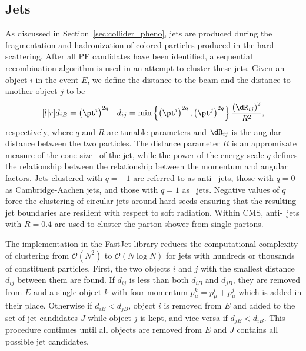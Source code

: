 \subsection{Jets}
\label{sec:pf_jets}

As discussed in Section~\ref{sec:collider_pheno}, jets are produced during the fragmentation and hadronization of colored particles produced in the hard scattering.
After all PF candidates have been identified, a sequential recombination algorithm is used in an attempt to cluster these jets.
Given an object $i$ in the event $E$, we define the distance to the beam and the distance to another object $j$ to be
\begin{equation}
  \begin{matrix}[l | r]
    \displaystyle
    d_{iB} = \left(\pt^i\right)^{2q} &
    d_{ij} = \min \left\{\left(\pt^i\right)^{2q}, \left(\pt^j\right)^{2q} \right\} \dfrac{\left(\dR_{ij}\right)^2}{R^2} ,
  \end{matrix}
\end{equation}
respectively, where $q$ and $R$ are tunable parameters and $\dR_{ij}$ is the angular distance between the two particles.
The distance parameter $R$ is an appromixate measure of the cone size \dR\ of the jet, while the power of the energy scale $q$ defines the relationship between the relationship between the momentum and angular factors.
Jets clustered with $q = -1$ are referred to as anti-\kt\ jets, those with $q = 0$ as Cambridge-Aachen jets, and those with $q = 1$ as \kt\ jets.  
Negative values of $q$ force the clustering of circular jets around hard seeds ensuring that the resulting jet boundaries are resilient with respect to soft radiation.
Within CMS, anti-\kt\ jets with $R = 0.4$ are used to cluster the parton shower from single partons.

The implementation in the FastJet library reduces the computational complexity of clustering from $\mathcal{O}(N^2)$ to $\mathcal{O}(N \log N)$ for jets with hundreds or thousands of constituent particles.
First, the two objects $i$ and $j$ with the smallest distance $d_{ij}$ between them are found. 
If $d_{ij}$ is less than both $d_{iB}$ and $d_{jB}$, they are removed from $E$ and a single object $k$ with four-momentum $p_\mu^k = p_\mu^i + p_\mu^j$ which is added in their place. 
Otherwise if $d_{iB} < d_{jB}$, object $i$ is removed from $E$ and added to the set of jet candidates $J$ while object $j$ is kept, and vice versa if $d_{jB} < d_{iB}$.
This procedure continues until all objects are removed from $E$ and $J$ contains all possible jet candidates.

